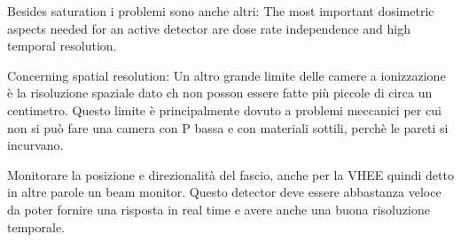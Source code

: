         Besides saturation i problemi sono anche altri:
        The most important dosimetric aspects needed for an active detector are dose rate independence and high temporal resolution.


        Concerning spatial resolution: Un altro grande limite delle camere a ionizzazione è la risoluzione spaziale dato ch non posson essere fatte più piccole di circa un centimetro. Questo limite è principalmente dovuto a problemi meccanici per cui non si può fare una camera con P bassa e con materiali sottili, perchè le pareti si incurvano. 

        Monitorare la posizione e direzionalità del fascio, anche per la VHEE quindi detto in altre parole un beam monitor.
        Questo detector deve essere abbastanza veloce da poter fornire una risposta in real time e avere anche una buona risoluzione temporale. 

    
    





